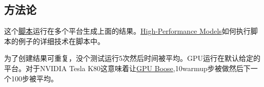  \subsection{方法论}
 这个\href{https://github.com/tensorflow/benchmarks/tree/master/scripts/tf_cnn_benchmarks}{脚本}运行在多个平台生成上面的结果。\href{https://www.tensorflow.org/performance/performance_models}{High-Performance Models}如何执行脚本的例子的详细技术在脚本中。

 为了创建结果可重复，没个测试运行5次然后时间被平均。GPU运行在默认给定的平台。对于NVIDIA Tesla K80这意味着让\href{https://devblogs.nvidia.com/parallelforall/increase-performance-gpu-boost-k80-autoboost/}{GPU Boose},10warmup步被做然后下一个100步被平均。













